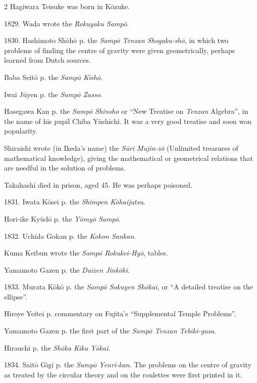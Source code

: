 \documentclass[11pt]{article}
\newcommand{\scanfooter}{}
\begin{document}
\begin{multicols}{2}
Hagiwara Teisuke was born in Kōzuke.

1829. Wada wrote the \emph{Rokuyaku Sampō}.

1830. Hashimoto Shōhō p. the \emph{Sampō Tenzan Shogaku-shō}, in which two problems of finding the centre of gravity were given geometrically, perhaps learned from Dutch sources.

Baba Seitō p. the \emph{Sampō Kishō}.

Iwai Jūyen p. the \emph{Sampō Zasso}.

Hasegawa Kan p. the \emph{Sampō Shinsho} or ``New Treatise on \emph{Tenzan} Algebra'', in the name of his pupil Chiba Yūshichi. It was a very good treatise and soon won popularity.

Shiraishi wrote (in Ikeda's name) the \emph{Sūri Mujin-zō} (Unlimited treasures of mathematical knowledge), giving the mathematical or geometrical relations that are needful in the solution of problems.

Takahashi died in prison, aged 45. He was perhaps poisoned.

1831. Iwata Kōsei p. the \emph{Shimpen Kōhaijutsu}.

Hori-ike Kyūdō p. the \emph{Yōmyō Sampō}.

1832. Uchida Gokan p. the \emph{Kokon Sankan}.

Kuma Keibun wrote the \emph{Sampō Rokukei-Hyō}, tables.

Yamamoto Gazen p. the \emph{Daizen Jinkōki}.

1833. Murata Kōkō p. the \emph{Sampō Sokuyen Shōkai}, or ``A detailed treatise on the ellipse''.

Hiroye Yeitei p. commentary on Fujita's ``Supplemental Temple Problems''.

Yamamoto Gazen p. the first part of the \emph{Sampō Tenzan Tebiki-gusa}.

Hirauchi p. the \emph{Shōka Kiku Yōkai}.

1834. Saitō Gigi p. the \emph{Sampō Yenri-kan}. The problems on the centre of gravity as treated by the circular theory and on the roulettes were first printed in it.
\end{multicols}
\scanfooter
\end{document}
